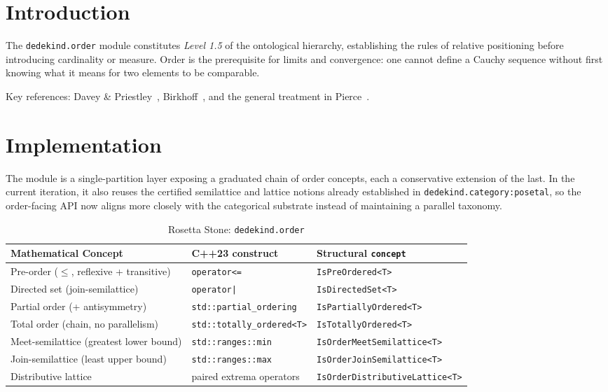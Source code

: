 \documentclass[11pt, a4paper]{report}
\begin{document}
\section{Introduction}

The \texttt{dedekind.order} module constitutes \emph{Level 1.5} of the ontological hierarchy, establishing the rules of relative positioning before introducing cardinality or measure.
Order is the prerequisite for limits and convergence: one cannot define a Cauchy sequence without first knowing what it means for two elements to be comparable.

Key references: Davey \& Priestley~\cite{davey2002introduction}, Birkhoff~\cite{birkhoff1940lattice}, and the general treatment in Pierce~\cite{pierce1991basic}.

\section{Implementation}

The module is a single-partition layer exposing a graduated chain of order concepts, each a conservative extension of the last. In the current iteration, it also reuses the certified semilattice and lattice notions already established in \texttt{dedekind.category:posetal}, so the order-facing API now aligns more closely with the categorical substrate instead of maintaining a parallel taxonomy.

\begin{table}[ht]
\centering
\caption{Rosetta Stone: \texttt{dedekind.order}}
\label{table:order}
\begin{tabular}{lll}
\toprule
\textbf{Mathematical Concept} & \textbf{C++23 construct} & \textbf{Structural \texttt{concept}} \\
\midrule
Pre-order ($\leq$, reflexive + transitive) & \texttt{operator<=} & \texttt{IsPreOrdered<T>} \\
Directed set (join-semilattice) & \texttt{operator|} & \texttt{IsDirectedSet<T>} \\
Partial order (+ antisymmetry) & \texttt{std::partial\_ordering} & \texttt{IsPartiallyOrdered<T>} \\
Total order (chain, no parallelism) & \texttt{std::totally\_ordered<T>} & \texttt{IsTotallyOrdered<T>} \\
Meet-semilattice (greatest lower bound) & \texttt{std::ranges::min} & \texttt{IsOrderMeetSemilattice<T>} \\
Join-semilattice (least upper bound) & \texttt{std::ranges::max} & \texttt{IsOrderJoinSemilattice<T>} \\
Distributive lattice & paired extrema operators & \texttt{IsOrderDistributiveLattice<T>} \\
\bottomrule
\end{tabular}
\end{table}
\end{document}

